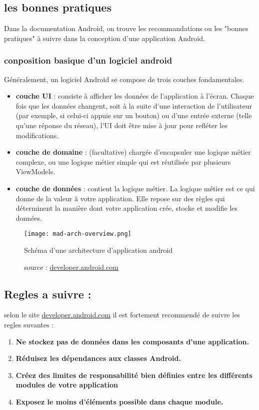\subsection{les bonnes pratiques}
Dans la documentation Android, on trouve les recommandations ou les "bonnes pratiques" à suivre dans la conception d'une application Android.
\subsubsection{conposition basique d'un logiciel android}
Généralement, un logiciel Android se compose de trois couches fondamentales.
\begin{itemize}
    \item \textbf{couche UI} : consiste à afficher les données de l'application à l'écran. Chaque fois que les données changent, soit à la suite d'une interaction de l'utilisateur (par exemple, si celui-ci appuie sur un bouton) ou d'une entrée externe (telle qu'une réponse du réseau), l'UI doit être mise à jour pour refléter les modifications.
    \item \textbf{couche de domaine} : (facultative) chargée d'encapsuler une logique métier complexe, ou une logique métier simple qui est réutilisée par plusieurs ViewModels.
    \item \textbf{couche de données} : contient la logique métier. La logique métier est ce qui donne de la valeur à votre application. Elle repose sur des règles qui déterminent la manière dont votre application crée, stocke et modifie les données.
\end{itemize}
\begin{center}
    \begin{figure}[h]
        \centering
        \texttt{[image: mad-arch-overview.png]}
        \caption{Schéma d'une architecture d'application android} \label{android app schemas}
        \caption*{\small{source : \url{developer.android.com}}}
    \end{figure}
\end{center}
\subsection{Regles a suivre :}
selon le site \url{developer.android.com} il est fortement recommendé de suivre les regles suvantes :
\begin{enumerate}
    \item \textbf{Ne stockez pas de données dans les composants d'une application.}
    \item \textbf{Réduisez les dépendances aux classes Android.}
    \item \textbf{Créez des limites de responsabilité bien définies entre les différents modules de votre application}
    \item \textbf{Exposez le moins d'éléments possible dans chaque module.}
\end{enumerate}
\cite{androidGuideLarchitecture}

